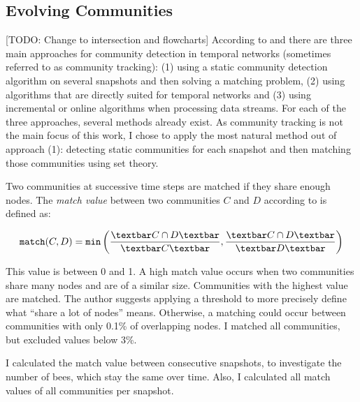 \subsection{Evolving Communities}
\label{sec:bg:tracking}
[TODO: Change to intersection and flowcharts]
According to \textcite{aynaud2013communities} and  \textcite{brodka2014community} there are three main approaches for community detection in temporal networks (sometimes referred to as community tracking): (1) using a static community detection algorithm on several snapshots and then solving a matching problem, (2) using algorithms that are directly suited for temporal networks and (3) using incremental or online algorithms when processing data streams. For each of the three approaches, several methods already exist.
As community tracking is not the main focus of this work, I chose to apply the most natural method out of approach (1): detecting static communities for each snapshot and then matching those communities using set theory.


Two communities at successive time steps are matched if they share enough nodes.
The \emph{match value} between two communities $C$ and $D$ according to \textcite{hopcroft2004tracking} is defined as:

\begin{equation}
\label{eq:match}
\texttt{match}(C,D) = \texttt{min}\left( \frac{\textbar C\cap D \textbar}{\textbar C\textbar }, \frac{\textbar C\cap D \textbar}{\textbar D \textbar }\right)
\end{equation}


This value is between 0 and 1. A high match value occurs when two communities share many nodes and are of a similar size. Communities with the highest value are matched. The author suggests applying a threshold to more precisely define what ``share a lot of nodes'' means. Otherwise, a matching could occur between communities with only 0.1\% of overlapping nodes. I matched all communities, but excluded values below 3\%.


I calculated the match value between consecutive snapshots, to investigate the number of bees, which stay the same over time. Also, I calculated all match values of all communities per snapshot.